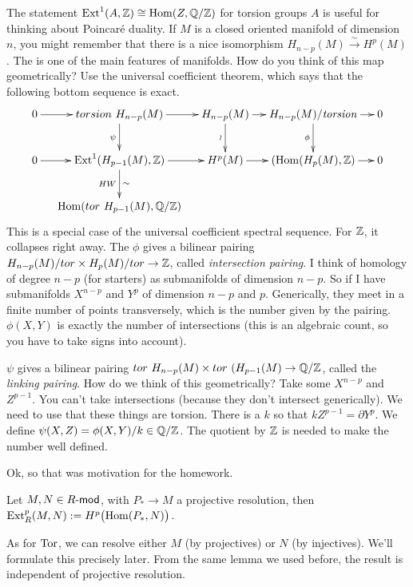 
The statement $\ext^1(A,\ZZ)\cong \hom(Z,\QQ/\ZZ)$ for torsion groups $A$ is useful for thinking about Poincar\'e duality. If $M$ is a closed oriented manifold of dimension $n$, you might remember that there is a nice isomorphism $H_{n-p}(M)\xrightarrow\sim H^p(M)$. The is one of the main features of manifolds. How do you think of this map geometrically? Use the universal coefficient theorem, which says that the following bottom sequence is exact.
\[\xymatrix@C-1pc{
0\ar[r] & torsion\ H_{n-p}(M)\ar[r]\ar[d]_\psi & H_{n-p}(M)\ar[d]_\wr \ar[r] & H_{n-p}(M)/\mathit{torsion} \ar[r]\ar[d]_\phi & 0 \\
 0\ar[r]& \ext^1(H_{p-1}(M),\ZZ)\ar[d]^\sim_{HW}\ar[r]& H^p(M)\ar[r] & (\hom(H_p(M),\ZZ)\ar[r]& 0\\
 & \hom(tor\ H_{p-1}(M),\QQ/\ZZ)
}\]
This is a special case of the universal coefficient spectral sequence. For $\ZZ$, it collapses right away. The $\phi$ gives a bilinear pairing $H_{n-p}(M)/tor \times H_p(M)/tor \to \ZZ$, called \emph{intersection pairing}. I think of homology of degree $n-p$ (for starters) as submanifolds of dimension $n-p$. So if I have submanifolds $X^{n-p}$ and $Y^p$ of dimension $n-p$ and $p$. Generically, they meet in a finite number of points transversely, which is the number given by the pairing. $\phi(X,Y)$ is exactly the number of intersections (this is an algebraic count, so you have to take signs into account).

$\psi$ gives a bilinear pairing $tor\ H_{n-p}(M)\times tor\ (H_{p-1}(M)\to \QQ/\ZZ$, called the \emph{linking pairing}. How do we think of this geometrically? Take some $X^{n-p}$ and $Z^{p-1}$. You can't take intersections (because they don't intersect generically). We need to use that these things are torsion. There is a $k$ so that $k Z^{p-1}=\partial Y^p$. We define $\psi(X,Z)=\phi(X,Y)/k\in \QQ/\ZZ$. The quotient by $\ZZ$ is needed to make the number well defined.

Ok, so that was motivation for the homework.

\bigskip
\begin{definition}
 Let $M,N\in R\mod$, with $P_*\to M$ a projective resolution, then $\ext^p_R(M,N):= H^p\bigl(\hom(P_*,N)\bigr)$.
\end{definition}
As for $\tor$, we can resolve either $M$ (by projectives) or $N$ (by injectives). We'll formulate this precisely later. From the same lemma we used before, the result is independent of projective resolution.

